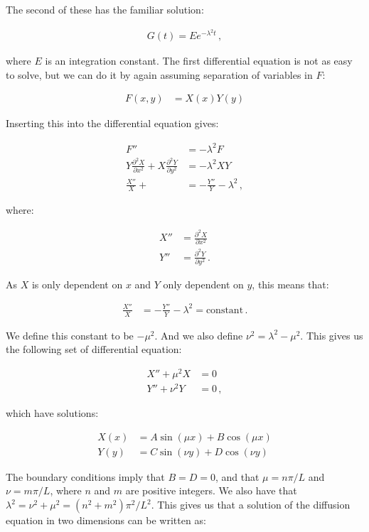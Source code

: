 \documentclass[reprint,english,notitlepage]{revtex4-1}  %
\begin{document}
The second of these has the familiar solution:

\begin{align*}
G(t) = Ee^{-\lambda^2 t} \, ,
\end{align*}

where $E$ is an integration constant. The first differential equation is not as easy to solve, but we can do it by again assuming separation of variables in $F$:

\begin{align*}
F(x,y) &= X(x) Y(y)
\end{align*}

Inserting this into the differential equation gives:

\begin{align*}
F'' &= -\lambda^2 F \\
Y \frac{\partial^2 X}{\partial x^2} + X \frac{\partial^2 Y}{\partial y^2} &= -\lambda^2 XY \\
\frac{X''}{X} +  &= - \frac{Y''}{Y} - \lambda^2 \, ,
\end{align*}

where:

\begin{align*}
X'' &= \frac{\partial^2 X}{\partial x^2} \\
Y'' &= \frac{\partial^2 Y}{\partial y^2} \, .
\end{align*}

As $X$ is only dependent on $x$ and $Y$ only dependent on $y$, this means that:

\begin{align*}
\frac{X''}{X} &= - \frac{Y''}{Y} - \lambda^2 = \text{constant} \, .
\end{align*}

We define this constant to be $-\mu^2$. And we also define $\nu^2 = \lambda^2 - \mu^2$. This gives us the following set of differential equation:

\begin{align*}
X'' + \mu^2 X &= 0 \\
Y'' + \nu^2 Y &= 0 \, ,
\end{align*}  

which have solutions:

\begin{align*}
X(x) &= A \sin(\mu x) + B\cos(\mu x) \\
Y(y) &= C \sin (\nu y) + D \cos (\nu y)
\end{align*}

The boundary conditions imply that $B=D=0$, and that $\mu = n\pi/L$ and $\nu = m\pi/L$, where $n$ and $m$ are positive integers. We also have that $\lambda^2 = \nu^2 + \mu^2 = (n^2+m^2) \pi^2/L^2$. This gives us that a solution of the diffusion equation in two dimensions can be written as:
\end{document}

